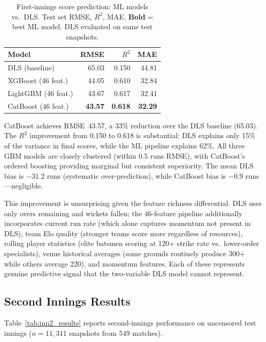 \documentclass[10pt,a4paper,twocolumn]{article}
\begin{document}
\begin{table}[htbp]
\centering
\caption{First-innings score prediction: ML models vs.\ DLS. Test set RMSE, $R^2$, MAE. \textbf{Bold} = best ML model. DLS evaluated on same test snapshots.}
\label{tab:inn1_v2}
\small
\begin{tabular}{lrrr}
\toprule
\textbf{Model} & \textbf{RMSE} & $R^2$ & \textbf{MAE} \\
\midrule
DLS (baseline)       & 65.03 & 0.150 & 44.81 \\
\midrule
XGBoost (46 feat.)   & 44.05 & 0.610 & 32.84 \\
LightGBM (46 feat.)  & 43.67 & 0.617 & 32.41 \\
CatBoost (46 feat.)  & \textbf{43.57} & \textbf{0.618} & \textbf{32.29} \\
\bottomrule
\end{tabular}
\end{table}

CatBoost achieves RMSE~43.57, a 33\% reduction over the DLS baseline (65.03). The $R^2$ improvement from 0.150 to 0.618 is substantial: DLS explains only 15\% of the variance in final scores, while the ML pipeline explains 62\%. All three GBM models are closely clustered (within 0.5 runs RMSE), with CatBoost's ordered boosting providing marginal but consistent superiority. The mean DLS bias is $-31.2$ runs (systematic over-prediction), while CatBoost bias is $-0.9$ runs---negligible.

This improvement is unsurprising given the feature richness differential. DLS uses only overs remaining and wickets fallen; the 46-feature pipeline additionally incorporates current run rate (which alone captures momentum not present in DLS), team Elo quality (stronger teams score more regardless of resources), rolling player statistics (elite batsmen scoring at 120+ strike rate vs.\ lower-order specialists), venue historical averages (some grounds routinely produce 300+ while others average 220), and momentum features. Each of these represents genuine predictive signal that the two-variable DLS model cannot represent.

\subsection{Second Innings Results}

Table~\ref{tab:inn2_results} reports second-innings performance on uncensored test innings ($n = 11,311$ snapshots from 549 matches).
\end{document}

